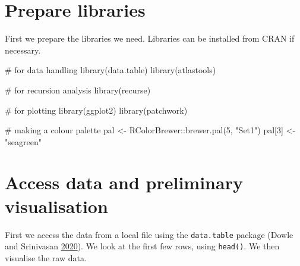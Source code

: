 \documentclass[]{scrreprt}
\newenvironment{Shaded}{}{}
\newcommand{\CommentTok}[1]{\textcolor[rgb]{0.00,0.50,0.00}{#1}}
\newcommand{\DecValTok}[1]{#1}
\newcommand{\KeywordTok}[1]{\textcolor[rgb]{0.00,0.00,1.00}{#1}}
\newcommand{\NormalTok}[1]{#1}
\newcommand{\OperatorTok}[1]{#1}
\newcommand{\StringTok}[1]{\textcolor[rgb]{0.00,0.50,0.50}{#1}}
\begin{document}
\hypertarget{prepare-libraries}{%
\section{Prepare libraries}\label{prepare-libraries}}

First we prepare the libraries we need. Libraries can be installed from CRAN if necessary.

\begin{Shaded}
\begin{Highlighting}[]
\CommentTok{# for data handling}
\KeywordTok{library}\NormalTok{(data.table)}
\KeywordTok{library}\NormalTok{(atlastools)}

\CommentTok{# for recursion analysis}
\KeywordTok{library}\NormalTok{(recurse)}

\CommentTok{# for plotting}
\KeywordTok{library}\NormalTok{(ggplot2)}
\KeywordTok{library}\NormalTok{(patchwork)}

\CommentTok{# making a colour palette}
\NormalTok{pal <-}\StringTok{ }\NormalTok{RColorBrewer}\OperatorTok{::}\KeywordTok{brewer.pal}\NormalTok{(}\DecValTok{5}\NormalTok{, }\StringTok{"Set1"}\NormalTok{)}
\NormalTok{pal[}\DecValTok{3}\NormalTok{] <-}\StringTok{ "seagreen"}
\end{Highlighting}
\end{Shaded}

\hypertarget{access-data-and-preliminary-visualisation}{%
\section{Access data and preliminary visualisation}\label{access-data-and-preliminary-visualisation}}

First we access the data from a local file using the \texttt{data.table} package (Dowle and Srinivasan \protect\hyperlink{ref-dowle2020}{2020}).
We look at the first few rows, using \texttt{head()}.
We then visualise the raw data.
\end{document}

